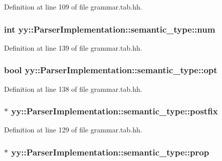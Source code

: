 Definition at line 109 of file grammar.tab.hh.

\hypertarget{unionyy_1_1_parser_implementation_1_1semantic__type_adec5c3bd063edefada718fe2891ad44b}{
\subsubsection[{num}]{\setlength{\rightskip}{0pt plus 5cm}int {\bf yy::ParserImplementation::semantic\_\-type::num}}}
\label{unionyy_1_1_parser_implementation_1_1semantic__type_adec5c3bd063edefada718fe2891ad44b}


Definition at line 139 of file grammar.tab.hh.

\hypertarget{unionyy_1_1_parser_implementation_1_1semantic__type_af4248f0a8fa18c36a1cd0c7162903783}{
\subsubsection[{opt}]{\setlength{\rightskip}{0pt plus 5cm}bool {\bf yy::ParserImplementation::semantic\_\-type::opt}}}
\label{unionyy_1_1_parser_implementation_1_1semantic__type_af4248f0a8fa18c36a1cd0c7162903783}


Definition at line 138 of file grammar.tab.hh.

\hypertarget{unionyy_1_1_parser_implementation_1_1semantic__type_a5646e43b98324d5136c4bd2c87d2aad4}{
\subsubsection[{postfix}]{$\ast$ {\bf yy::ParserImplementation::semantic\_\-type::postfix}}}
\label{unionyy_1_1_parser_implementation_1_1semantic__type_a5646e43b98324d5136c4bd2c87d2aad4}


Definition at line 129 of file grammar.tab.hh.

\hypertarget{unionyy_1_1_parser_implementation_1_1semantic__type_a1931a138d220aaf308dd091df5c3d08f}{
\subsubsection[{prop}]{$\ast$ {\bf yy::ParserImplementation::semantic\_\-type::prop}}}
\label{unionyy_1_1_parser_implementation_1_1semantic__type_a1931a138d220aaf308dd091df5c3d08f}


